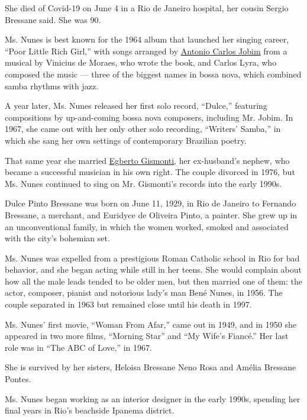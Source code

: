 She died of Covid-19 on June 4 in a Rio de Janeiro hospital, her cousin
Sergio Bressane said. She was 90.

Ms. Nunes is best known for the 1964 album that launched her singing
career, ``Poor Little Rich Girl,'' with songs arranged by
\href{https://www.nytimes.com/1994/12/09/obituaries/antonio-carlos-jobim-composer-dies-at-67.html}{Antonio
Carlos Jobim} from a musical by Vinicius de Moraes, who wrote the book,
and Carlos Lyra, who composed the music --- three of the biggest names
in bossa nova, which combined samba rhythms with jazz.

A year later, Ms. Nunes released her first solo record, ``Dulce,''
featuring compositions by up-and-coming bossa nova composers, including
Mr. Jobim. In 1967, she came out with her only other solo recording,
``Writers' Samba,'' in which she sang her own settings of contemporary
Brazilian poetry.

That same year she married
\href{https://www.ecmrecords.com/artists/1435045864/egberto-gismonti}{Egberto
Gismonti}, her ex-husband's nephew, who became a successful musician in
his own right. The couple divorced in 1976, but Ms. Nunes continued to
sing on Mr. Gismonti's records into the early 1990s.

Dulce Pinto Bressane was born on June 11, 1929, in Rio de Janeiro to
Fernando Bressane, a merchant, and Euridyce de Oliveira Pinto, a
painter. She grew up in an unconventional family, in which the women
worked, smoked and associated with the city's bohemian set.

Ms. Nunes was expelled from a prestigious Roman Catholic school in Rio
for bad behavior, and she began acting while still in her teens. She
would complain about how all the male leads tended to be older men, but
then married one of them: the actor, composer, pianist and notorious
lady's man Bené Nunes, in 1956. The couple separated in 1963 but
remained close until his death in 1997.

Ms. Nunes' first movie, ``Woman From Afar,'' came out in 1949, and in
1950 she appeared in two more films, ``Morning Star'' and ``My Wife's
Fiancé.'' Her last role was in ``The ABC of Love,'' in 1967.

She is survived by her sisters, Heloisa Bressane Neno Rosa and Amélia
Bressane Pontes.

Ms. Nunes began working as an interior designer in the early 1990s,
spending her final years in Rio's beachside Ipanema district.

\href{https://www.nytimes.com/interactive/2020/obituaries/people-died-coronavirus-obituaries.html?action=click\&pgtype=Article\&state=default\&region=BELOW_MAIN_CONTENT\&context=covid_obits_promo}{}

